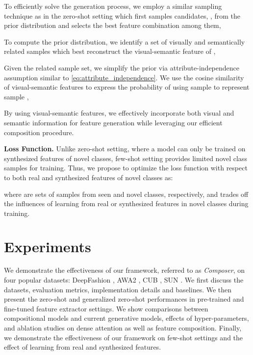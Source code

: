 \documentclass[10pt,journal,compsoc]{IEEEtran}
\newcommand{\1}{\boldsymbol{1}}
\newcommand{\0}{\boldsymbol{0}}
\newcommand{\<}{\langle}
\renewcommand{\>}{\rangle}
\newcommand{\myparagraph}[1]{\vspace{-2pt}\medskip\noindent\textbf{#1}}
\begin{document}
To efficiently solve the generation process, we employ a similar sampling technique as in the zero-shot setting which first samples candidates, , from the prior distribution and selects the best feature combination among them,

To compute the prior distribution, we identify a set of visually and semantically related samples  which best reconstruct the visual-semantic feature of , 

Given the related sample set, we simplify the prior via attribute-independence assumption  similar to \eqref{eq:attribute_independence}.
We use the cosine similarity of visual-semantic features to express the probability of using sample  to represent sample ,

By using visual-semantic features, we effectively incorporate both visual and semantic information for feature generation while leveraging our efficient composition procedure.

\myparagraph{Loss Function.}
Unlike zero-shot setting, where a model can only be trained on synthesized features of novel classes, few-shot setting provides limited novel class samples for training.
Thus, we propose to optimize the loss function with respect to both real and synthesized features of novel classes as:  

where  are sets of samples from seen and novel classes, respectively, and  trades off the influences of learning from real or synthesized features in novel classes during training.

\section{Experiments}
\label{sec:experiments}
We demonstrate the effectiveness of our framework, referred to as \emph{Composer}, on four popular datasets: DeepFashion \cite{Liu:CVPR16}, AWA2 \cite{Xian:PAMI18}, CUB \cite{Welinder:report10}, SUN \cite{Patterson:CVPR12}. 
We first discuss the datasets, evaluation metrics, implementation details and baselines. 
We then present the zero-shot and generalized zero-shot performances in pre-trained and fine-tuned feature extractor settings. We show comparisons between compositional models and current generative models, effects of hyper-parameters, and ablation studies on dense attention as well as feature composition.
Finally, we demonstrate the effectiveness of our framework on few-shot settings and the effect of learning from real and synthesized features.  
\end{document}
